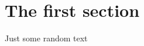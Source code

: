 \documentclass[12pt,article]{memoir}
\begin{document}
\section{The first section}
Just some random text
\begin{center}
\end{center}
\end{document}
